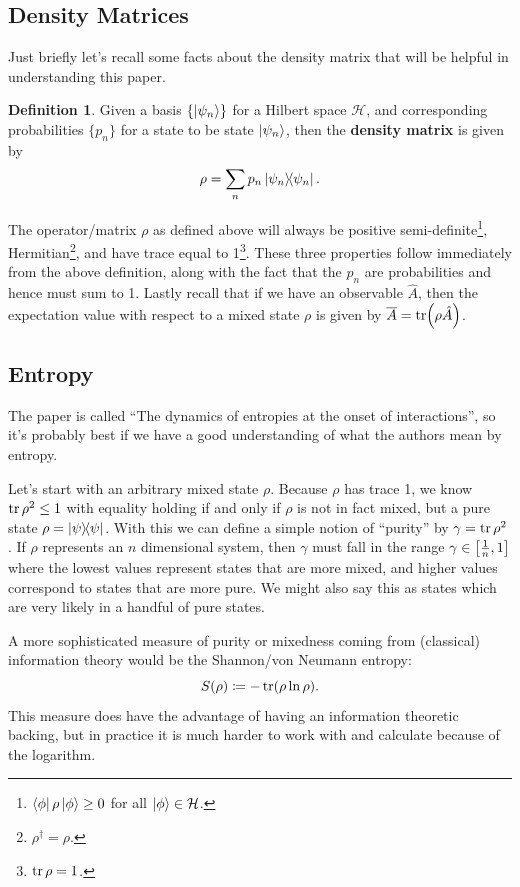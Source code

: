 \documentclass[11pt]{article}
\theoremstyle{definition}
\newtheorem{definition}{Definition}[section]
\begin{document}
\subsection{Density Matrices}\label{sec:density-matrices}
Just briefly let's recall some facts about the density matrix that will be helpful in understanding this paper.
\begin{definition}
	Given a basis $\{\ket{\psi_n}\}$ for a Hilbert space $\mathcal{H}$, and corresponding probabilities $\{p_n\}$ for a state to be state $\ket{\psi_n}$, then the \textbf{density matrix} is given by
	\begin{equation*}
		\rho = \sum_n p_n\ketbra{\psi_n}.
	\end{equation*}
\end{definition}
The operator/matrix $\rho$ as defined above will always be positive semi-definite\footnote{$\bra{\phi}\rho\ket{\phi}\geq 0$ for all $\ket{\phi}\in\mathcal{H}$.}, Hermitian\footnote{$\rho^\dagger = \rho$.}, and have trace equal to 1\footnote{$\tr\rho = 1$.}. These three properties follow immediately from the above definition, along with the fact that the $p_n$ are probabilities and hence must sum to 1. Lastly recall that if we have an observable $\hat{A}$, then the expectation value with respect to a mixed state $\rho$ is given by $\overline{A} = \tr(\rho\hat{A})$.

\subsection{Entropy}
The paper is called ``The dynamics of entropies at the onset of interactions'', so it's probably best if we have a good understanding of what the authors mean by entropy.

Let's start with an arbitrary mixed state $\rho$. Because $\rho$ has trace 1, we know $\tr\rho^2\leq 1$ with equality holding if and only if $\rho$ is not in fact mixed, but a pure state $\rho = \ketbra{\psi}$. With this we can define a simple notion of ``purity'' by $\gamma = \tr\rho^2$. If $\rho$ represents an $n$ dimensional system, then $\gamma$ must fall in the range $\gamma\in\qty[\frac{1}{n}, 1]$ where the lowest values represent states that are more mixed, and higher values correspond to states that are more pure. We might also say this as states which are very likely in a handful of pure states.

A more sophisticated measure of purity or mixedness coming from (classical) information theory would be the Shannon/von Neumann entropy:
\begin{equation*}
	S(\rho)\coloneqq -\tr(\rho\ln\rho).
\end{equation*}
This measure does have the advantage of having an information theoretic backing, but in practice it is much harder to work with and calculate because of the logarithm.
\end{document}
